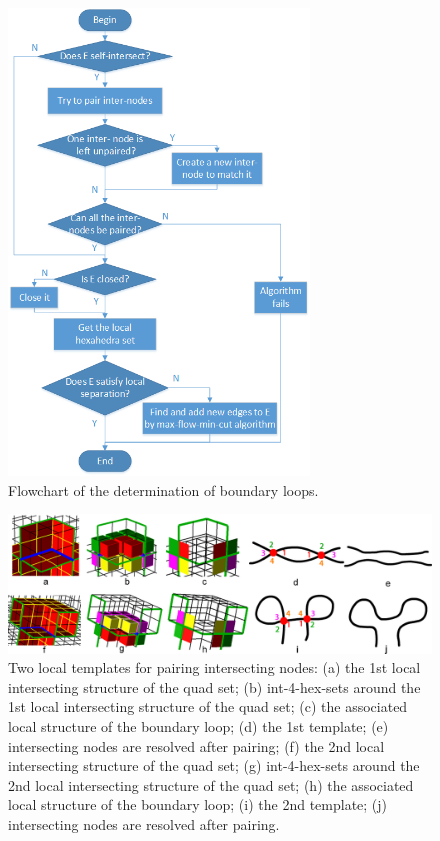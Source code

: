 \documentclass[final,5p,times,twocolumn]{elsarticle}
\begin{document}
\begin{figure}[htbp]
\begin{center}
\includegraphics[width=8cm]{figures/flow_det_loop.png}
\caption{Flowchart of the determination of boundary loops.}
\label{fig:flow_det_loop}
\end{center}
\end{figure}

\begin{figure}[htbp]
\begin{center}
\includegraphics[width=17cm]{figures/pair_patterns.png}
\caption{Two local templates for pairing intersecting nodes: (a) the 1st local intersecting structure of the quad set; (b) int-4-hex-sets around the 1st local intersecting structure of the quad set; (c) the associated local structure of the boundary loop; (d) the 1st template; (e) intersecting nodes are resolved after pairing; (f) the 2nd local intersecting structure of the quad set; (g) int-4-hex-sets around the 2nd local intersecting structure of the quad set; (h) the associated local structure of the boundary loop; (i) the 2nd template; (j) intersecting nodes are resolved after pairing.}
\label{fig:int_pair_tpl}
\end{center}
\end{figure}
\end{document}
